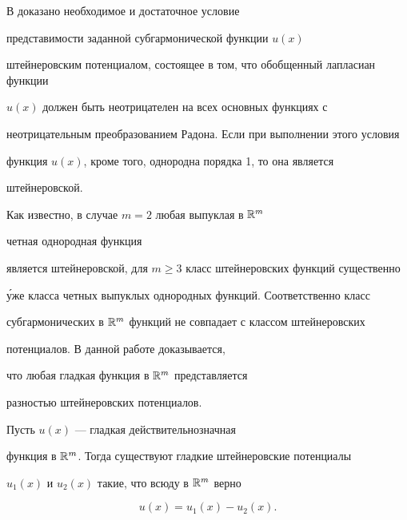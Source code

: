 В \cite{Sekerin1} доказано необходимое и достаточное условие


представимости заданной субгармонической функции $u(x)$ 


штейнеровским потенциалом, состоящее в том, что обобщенный лапласиан функции


$u(x)$ должен быть неотрицателен на всех основных функциях с 


неотрицательным преобразованием Радона. Если при выполнении этого условия 


функция $u(x)$, кроме того, однородна порядка 1, то она является 


штейнеровской. 





Как известно, в случае $m=2$ любая выпуклая в $\Bbb R^m$ 


четная однородная функция 


является штейнеровской, для $m\ge 3$ класс штейнеровских функций существенно


\'уже класса четных выпуклых однородных функций. Соответственно класс 


субгармонических в $\Bbb R^m$ функций не совпадает с классом штейнеровских 


потенциалов. В данной работе доказывается,


что любая гладкая функция в $\Bbb R^m$ представляется


разностью штейнеровских потенциалов. 





\begin{thmnonum}


Пусть $u(x)$ --- гладкая действительнозначная 


функция в $\Bbb R^m$. Тогда существуют гладкие штейнеровские потенциалы 


$u_1(x)$ и $u_2(x)$ такие, что всюду в $\Bbb R^m$ верно


$$


u(x)=u_1(x)-u_2(x).


$$


\end{thmnonum}





